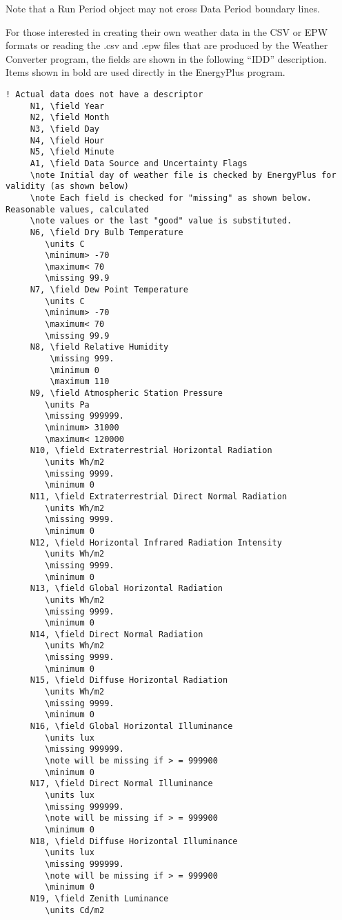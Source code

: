 Note that a Run Period object may not cross Data Period boundary lines.

For those interested in creating their own weather data in the CSV or EPW formats or reading the .csv and .epw files that are produced by the Weather Converter program, the fields are shown in the following ``IDD'' description. Items shown in bold are used directly in the EnergyPlus program.

\begin{lstlisting}
! Actual data does not have a descriptor
     N1, \field Year
     N2, \field Month
     N3, \field Day
     N4, \field Hour
     N5, \field Minute
     A1, \field Data Source and Uncertainty Flags
     \note Initial day of weather file is checked by EnergyPlus for validity (as shown below)
     \note Each field is checked for "missing" as shown below. Reasonable values, calculated
     \note values or the last "good" value is substituted.
     N6, \field Dry Bulb Temperature
        \units C
        \minimum> -70
        \maximum< 70
        \missing 99.9
     N7, \field Dew Point Temperature
        \units C
        \minimum> -70
        \maximum< 70
        \missing 99.9
     N8, \field Relative Humidity
         \missing 999.
         \minimum 0
         \maximum 110
     N9, \field Atmospheric Station Pressure
        \units Pa
        \missing 999999.
        \minimum> 31000
        \maximum< 120000
     N10, \field Extraterrestrial Horizontal Radiation
        \units Wh/m2
        \missing 9999.
        \minimum 0
     N11, \field Extraterrestrial Direct Normal Radiation
        \units Wh/m2
        \missing 9999.
        \minimum 0
     N12, \field Horizontal Infrared Radiation Intensity
        \units Wh/m2
        \missing 9999.
        \minimum 0
     N13, \field Global Horizontal Radiation
        \units Wh/m2
        \missing 9999.
        \minimum 0
     N14, \field Direct Normal Radiation
        \units Wh/m2
        \missing 9999.
        \minimum 0
     N15, \field Diffuse Horizontal Radiation
        \units Wh/m2
        \missing 9999.
        \minimum 0
     N16, \field Global Horizontal Illuminance
        \units lux
        \missing 999999.
        \note will be missing if > = 999900
        \minimum 0
     N17, \field Direct Normal Illuminance
        \units lux
        \missing 999999.
        \note will be missing if > = 999900
        \minimum 0
     N18, \field Diffuse Horizontal Illuminance
        \units lux
        \missing 999999.
        \note will be missing if > = 999900
        \minimum 0
     N19, \field Zenith Luminance
        \units Cd/m2

\end{lstlisting}
